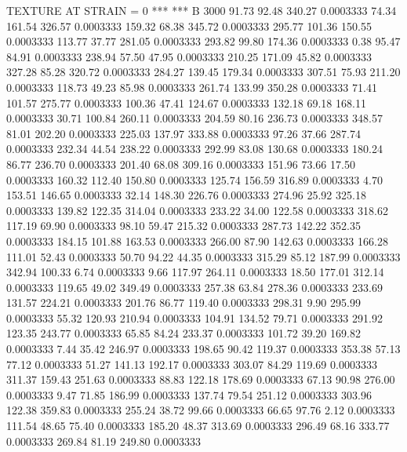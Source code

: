 TEXTURE AT STRAIN = 0
***
***
B 3000
  91.73   92.48  340.27   0.0003333
  74.34  161.54  326.57   0.0003333
 159.32   68.38  345.72   0.0003333
 295.77  101.36  150.55   0.0003333
 113.77   37.77  281.05   0.0003333
 293.82   99.80  174.36   0.0003333
   0.38   95.47   84.91   0.0003333
 238.94   57.50   47.95   0.0003333
 210.25  171.09   45.82   0.0003333
 327.28   85.28  320.72   0.0003333
 284.27  139.45  179.34   0.0003333
 307.51   75.93  211.20   0.0003333
 118.73   49.23   85.98   0.0003333
 261.74  133.99  350.28   0.0003333
  71.41  101.57  275.77   0.0003333
 100.36   47.41  124.67   0.0003333
 132.18   69.18  168.11   0.0003333
  30.71  100.84  260.11   0.0003333
 204.59   80.16  236.73   0.0003333
 348.57   81.01  202.20   0.0003333
 225.03  137.97  333.88   0.0003333
  97.26   37.66  287.74   0.0003333
 232.34   44.54  238.22   0.0003333
 292.99   83.08  130.68   0.0003333
 180.24   86.77  236.70   0.0003333
 201.40   68.08  309.16   0.0003333
 151.96   73.66   17.50   0.0003333
 160.32  112.40  150.80   0.0003333
 125.74  156.59  316.89   0.0003333
   4.70  153.51  146.65   0.0003333
  32.14  148.30  226.76   0.0003333
 274.96   25.92  325.18   0.0003333
 139.82  122.35  314.04   0.0003333
 233.22   34.00  122.58   0.0003333
 318.62  117.19   69.90   0.0003333
  98.10   59.47  215.32   0.0003333
 287.73  142.22  352.35   0.0003333
 184.15  101.88  163.53   0.0003333
 266.00   87.90  142.63   0.0003333
 166.28  111.01   52.43   0.0003333
  50.70   94.22   44.35   0.0003333
 315.29   85.12  187.99   0.0003333
 342.94  100.33    6.74   0.0003333
   9.66  117.97  264.11   0.0003333
  18.50  177.01  312.14   0.0003333
 119.65   49.02  349.49   0.0003333
 257.38   63.84  278.36   0.0003333
 233.69  131.57  224.21   0.0003333
 201.76   86.77  119.40   0.0003333
 298.31    9.90  295.99   0.0003333
  55.32  120.93  210.94   0.0003333
 104.91  134.52   79.71   0.0003333
 291.92  123.35  243.77   0.0003333
  65.85   84.24  233.37   0.0003333
 101.72   39.20  169.82   0.0003333
   7.44   35.42  246.97   0.0003333
 198.65   90.42  119.37   0.0003333
 353.38   57.13   77.12   0.0003333
  51.27  141.13  192.17   0.0003333
 303.07   84.29  119.69   0.0003333
 311.37  159.43  251.63   0.0003333
  88.83  122.18  178.69   0.0003333
  67.13   90.98  276.00   0.0003333
   9.47   71.85  186.99   0.0003333
 137.74   79.54  251.12   0.0003333
 303.96  122.38  359.83   0.0003333
 255.24   38.72   99.66   0.0003333
  66.65   97.76    2.12   0.0003333
 111.54   48.65   75.40   0.0003333
 185.20   48.37  313.69   0.0003333
 296.49   68.16  333.77   0.0003333
 269.84   81.19  249.80   0.0003333
